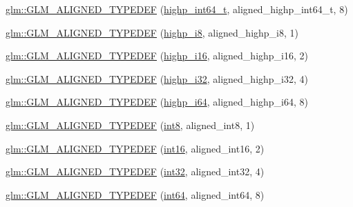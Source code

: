 \begin{DoxyCompactItemize}
\item 
\hyperlink{group__gtx__type__aligned_ga790cfff1ca39d0ed696ffed980809311}{glm\+::\+G\+L\+M\+\_\+\+A\+L\+I\+G\+N\+E\+D\+\_\+\+T\+Y\+P\+E\+D\+EF} (\hyperlink{group__gtc__type__precision_ga0f5186bde44471133b08057cae8a51ac}{highp\+\_\+int64\+\_\+t}, aligned\+\_\+highp\+\_\+int64\+\_\+t, 8)
\item 
\hyperlink{group__gtx__type__aligned_ga8265b91eb23c120a9b0c3e381bc37b96}{glm\+::\+G\+L\+M\+\_\+\+A\+L\+I\+G\+N\+E\+D\+\_\+\+T\+Y\+P\+E\+D\+EF} (\hyperlink{group__gtc__type__precision_ga8b9eb0b24cce7f14478bfcacb53ce839}{highp\+\_\+i8}, aligned\+\_\+highp\+\_\+i8, 1)
\item 
\hyperlink{group__gtx__type__aligned_gae6d384de17588d8edb894fbe06e0d410}{glm\+::\+G\+L\+M\+\_\+\+A\+L\+I\+G\+N\+E\+D\+\_\+\+T\+Y\+P\+E\+D\+EF} (\hyperlink{group__gtc__type__precision_gaa04399853952dbce29cb62e2432f350a}{highp\+\_\+i16}, aligned\+\_\+highp\+\_\+i16, 2)
\item 
\hyperlink{group__gtx__type__aligned_ga9c8172b745ee03fc5b2b91c350c2922f}{glm\+::\+G\+L\+M\+\_\+\+A\+L\+I\+G\+N\+E\+D\+\_\+\+T\+Y\+P\+E\+D\+EF} (\hyperlink{group__gtc__type__precision_ga197d19b585222da57d70238a5cfc2be8}{highp\+\_\+i32}, aligned\+\_\+highp\+\_\+i32, 4)
\item 
\hyperlink{group__gtx__type__aligned_ga77e0dff12aa4020ddc3f8cabbea7b2e6}{glm\+::\+G\+L\+M\+\_\+\+A\+L\+I\+G\+N\+E\+D\+\_\+\+T\+Y\+P\+E\+D\+EF} (\hyperlink{group__gtc__type__precision_gad3cb9a0ac0266ea2c51c6fac256345d1}{highp\+\_\+i64}, aligned\+\_\+highp\+\_\+i64, 8)
\item 
\hyperlink{group__gtx__type__aligned_gabd82b9faa9d4d618dbbe0fc8a1efee63}{glm\+::\+G\+L\+M\+\_\+\+A\+L\+I\+G\+N\+E\+D\+\_\+\+T\+Y\+P\+E\+D\+EF} (\hyperlink{group__gtc__type__precision_ga96254f9c1c4506fc8eb5cf3301ce8565}{int8}, aligned\+\_\+int8, 1)
\item 
\hyperlink{group__gtx__type__aligned_ga285649744560be21000cfd81bbb5d507}{glm\+::\+G\+L\+M\+\_\+\+A\+L\+I\+G\+N\+E\+D\+\_\+\+T\+Y\+P\+E\+D\+EF} (\hyperlink{group__gtc__type__precision_ga2945a61d12771f8954994fcddf02b021}{int16}, aligned\+\_\+int16, 2)
\item 
\hyperlink{group__gtx__type__aligned_ga07732da630b2deda428ce95c0ecaf3ff}{glm\+::\+G\+L\+M\+\_\+\+A\+L\+I\+G\+N\+E\+D\+\_\+\+T\+Y\+P\+E\+D\+EF} (\hyperlink{group__gtc__type__precision_ga632d8b25f6b61659f39ea4321fab92a4}{int32}, aligned\+\_\+int32, 4)
\item 
\hyperlink{group__gtx__type__aligned_ga1a8da2a8c51f69c07a2e7f473aa420f4}{glm\+::\+G\+L\+M\+\_\+\+A\+L\+I\+G\+N\+E\+D\+\_\+\+T\+Y\+P\+E\+D\+EF} (\hyperlink{group__gtc__type__precision_ga435d75819cce297cc5fa21bd84ef89a5}{int64}, aligned\+\_\+int64, 8)

\end{DoxyCompactItemize}
